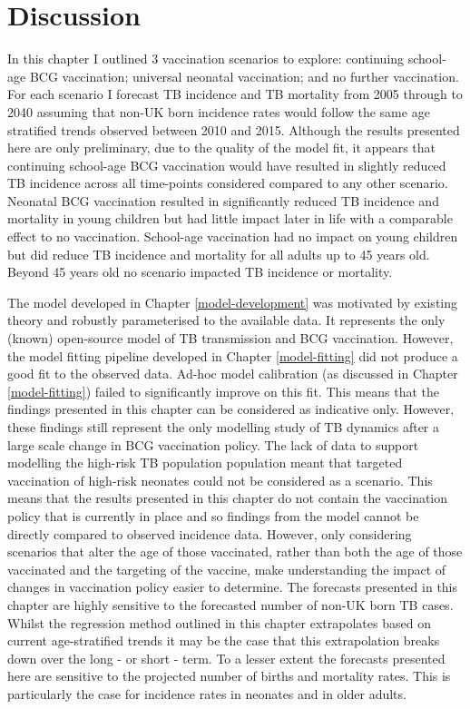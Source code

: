 \documentclass[11pt,twoside]{bristolthesis}
\begin{document}
  \hypertarget{discussion-7}{%
  \section{Discussion}\label{discussion-7}}
  
  In this chapter I outlined 3 vaccination scenarios to explore: continuing school-age BCG vaccination; universal neonatal vaccination; and no further vaccination. For each scenario I forecast TB incidence and TB mortality from 2005 through to 2040 assuming that non-UK born incidence rates would follow the same age stratified trends observed between 2010 and 2015. Although the results presented here are only preliminary, due to the quality of the model fit, it appears that continuing school-age BCG vaccination would have resulted in slightly reduced TB incidence across all time-points considered compared to any other scenario. Neonatal BCG vaccination resulted in significantly reduced TB incidence and mortality in young children but had little impact later in life with a comparable effect to no vaccination. School-age vaccination had no impact on young children but did reduce TB incidence and mortality for all adults up to 45 years old. Beyond 45 years old no scenario impacted TB incidence or mortality.
  
  The model developed in Chapter \ref{model-development} was motivated by existing theory and robustly parameterised to the available data. It represents the only (known) open-source model of TB transmission and BCG vaccination. However, the model fitting pipeline developed in Chapter \ref{model-fitting} did not produce a good fit to the observed data. Ad-hoc model calibration (as discussed in Chapter \ref{model-fitting}) failed to significantly improve on this fit. This means that the findings presented in this chapter can be considered as indicative only. However, these findings still represent the only modelling study of TB dynamics after a large scale change in BCG vaccination policy. The lack of data to support modelling the high-risk TB population population meant that targeted vaccination of high-risk neonates could not be considered as a scenario. This means that the results presented in this chapter do not contain the vaccination policy that is currently in place and so findings from the model cannot be directly compared to observed incidence data. However, only considering scenarios that alter the age of those vaccinated, rather than both the age of those vaccinated and the targeting of the vaccine, make understanding the impact of changes in vaccination policy easier to determine. The forecasts presented in this chapter are highly sensitive to the forecasted number of non-UK born TB cases. Whilst the regression method outlined in this chapter extrapolates based on current age-stratified trends it may be the case that this extrapolation breaks down over the long - or short - term. To a lesser extent the forecasts presented here are sensitive to the projected number of births and mortality rates. This is particularly the case for incidence rates in neonates and in older adults.
  
\end{document}
